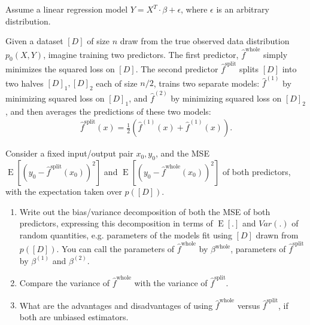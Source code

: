 \documentclass[11pt]{article}
\DeclareMathOperator{\E}{E}
\begin{document}
Assume a linear regression model $Y = X^T \cdot \beta + \epsilon$, where $\epsilon$ is an arbitrary distribution.

Given a dataset $[D]$ of size $n$ draw from the true observed data distribution $p_0(X, Y)$, imagine training two predictors.
The first predictor, $\hat{f}^{\text{whole}}$ simply minimizes the squared loss on $[D]$.
The second predictor $\hat{f}^{\text{split}}$ splits $[D]$ into two halves $[D]_1, [D]_2$ each of size $n/2$, trains two separate models:  $\hat{f}^{(1)}$ by minimizing squared loss on $[D]_1$, and $\hat{f}^{(2)}$ by minimizing squared loss on $[D]_2$, and then averages the predictions of these two models: 
\begin{align*}
\hat{f}^{\text{split}}(x) = \frac{1}{2} \left( \hat{f}^{(1)}(x) + \hat{f}^{(1)}(x) \right).
\end{align*}

Consider a fixed input/output pair $x_0,y_0$, and the MSE $\E[(y_0 - \hat{f}^{\text{split}}(x_0))^2]$ and $\E[(y_0 - \hat{f}^{\text{whole}}(x_0))^2]$ of both predictors, with the expectation taken over $p([D])$.
\begin{enumerate}
\item Write out the bias/variance decomposition of both the MSE of both predictors, expressing this decomposition in terms of $\E[.]$ and $Var(.)$ of random quantities, e.g. parameters of the models fit using $[D]$ drawn from $p([D])$.  You can call the parameters of $\hat{f}^{\text{whole}}$ by $\beta^{\text{whole}}$, parameters of $\hat{f}^{\text{split}}$ by $\beta^{(1)}$ and $\beta^{(2)}$.

\begin{answertext}{5cm}{}  
\end{answertext} 

\item Compare the variance of $\hat{f}^{\text{whole}}$ with the variance of $\hat{f}^{\text{split}}$.\\
\begin{answertext}{5cm}{}
\end{answertext} 

\pagebreak 

\item What are the advantages and disadvantages of using $\hat{f}^{\text{whole}}$ versus $\hat{f}^{\text{split}}$, if both are unbiased estimators.\\
\begin{answertext}{5cm}{}
\end{answertext} 
\end{enumerate}
\end{document}
